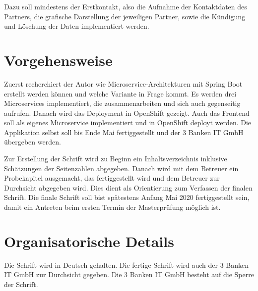 \documentclass[master,german]{hgbthesis}
\begin{document}
Dazu soll mindestens der Erstkontakt, also die Aufnahme der Kontaktdaten des Partners, die grafische Darstellung der jeweiligen Partner, sowie die Kündigung und Löschung der Daten implementiert werden.

\section{Vorgehensweise}
Zuerst recherchiert der Autor wie Microservice-Architekturen mit Spring Boot erstellt werden können und welche Variante in Frage kommt.
Es werden drei Microservices implementiert, die zusammenarbeiten und sich auch gegenseitig aufrufen.
Danach wird das Deployment in \mbox{OpenShift} gezeigt.
Auch das Frontend soll als eigenes Microservice implementiert und in OpenShift deployt werden. 
Die Applikation selbst soll bis Ende Mai fertiggestellt und der 3 Banken IT GmbH übergeben werden.

Zur Erstellung der Schrift wird zu Beginn ein Inhaltsverzeichnis inklusive Schätzungen der \mbox{Seitenzahlen} abgegeben. Danach wird mit dem Betreuer ein Probekapitel ausgemacht, das fertiggestellt wird und dem Betreuer zur Durchsicht abgegeben wird. Dies dient als Orientierung zum Verfassen der finalen Schrift. Die finale Schrift soll bist spätestens Anfang Mai 2020 fertiggestellt sein, damit ein Antreten beim ersten Termin der Masterprüfung möglich ist.

\section{Organisatorische Details}
Die Schrift wird in Deutsch gehalten.
Die fertige Schrift wird auch der 3 Banken IT GmbH zur Durchsicht gegeben. Die 3 Banken IT GmbH besteht auf die Sperre der Schrift.
\end{document}
